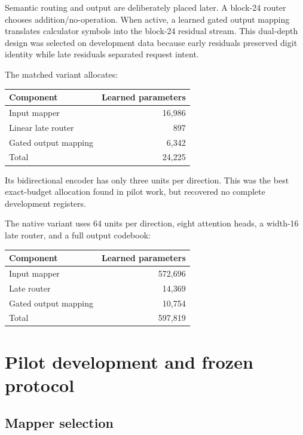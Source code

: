 \documentclass[11pt]{article}
\begin{document}
Semantic routing and output are deliberately placed later. A block-24 router
chooses addition/no-operation. When active, a learned gated output mapping
translates calculator symbols into the block-24 residual stream. This
dual-depth design was selected on development data because early residuals
preserved digit identity while late residuals separated request intent.

The matched variant allocates:

\begin{center}
\small
\begin{tabular}{lr}
\toprule
Component & Learned parameters\\
\midrule
Input mapper & 16,986\\
Linear late router & 897\\
Gated output mapping & 6,342\\
\midrule
Total & 24,225\\
\bottomrule
\end{tabular}
\end{center}

Its bidirectional encoder has only three units per direction. This was the
best exact-budget allocation found in pilot work, but recovered no complete
development registers.

The native variant uses 64 units per direction, eight attention heads, a
width-16 late router, and a full output codebook:

\begin{center}
\small
\begin{tabular}{lr}
\toprule
Component & Learned parameters\\
\midrule
Input mapper & 572,696\\
Late router & 14,369\\
Gated output mapping & 10,754\\
\midrule
Total & 597,819\\
\bottomrule
\end{tabular}
\end{center}

\section{Pilot development and frozen protocol}

\subsection{Mapper selection}
\end{document}
